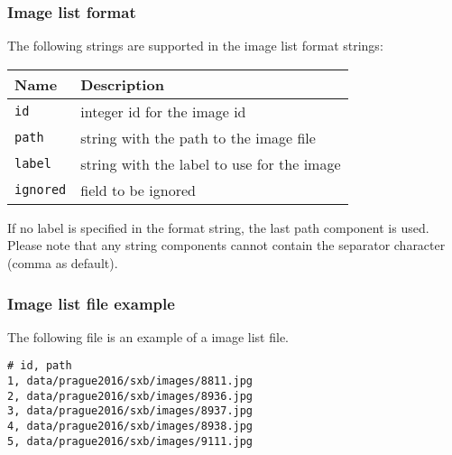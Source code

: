 \documentclass{article}
\begin{document}
\subsubsection{Image list format}
\label{sec:imageFormat}
The following strings are supported in the image list format strings:
\begin{center}
\begin{tabular}{l|l}
Name & Description\\
\hline
\texttt{id} & integer id for the image id\\
\texttt{path} & string with the path to the image file\\
\texttt{label} & string with the label to use for the image\\
\texttt{ignored} & field to be ignored\\
\end{tabular}
\end{center}
If no label is specified in the format string, the last path component
is used. Please note that any string components cannot contain the
separator character (comma as default).
\subsubsection{Image list file example}
\label{sec:imageExample}
The following file is an example of a image list file.
\begin{verbatim}
# id, path
1, data/prague2016/sxb/images/8811.jpg
2, data/prague2016/sxb/images/8936.jpg
3, data/prague2016/sxb/images/8937.jpg
4, data/prague2016/sxb/images/8938.jpg
5, data/prague2016/sxb/images/9111.jpg
\end{verbatim}

\newpage
\end{document}
